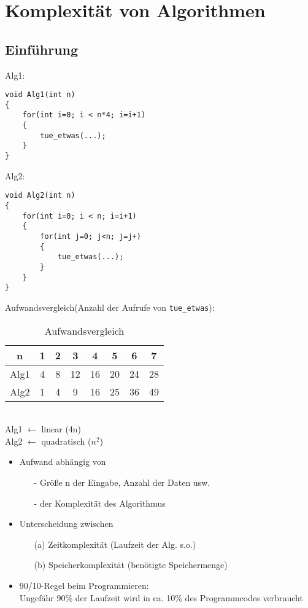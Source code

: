 \section{Komplexität von Algorithmen}
\subsection{Einführung}
Alg1:
\begin{lstlisting}
void Alg1(int n)
{
	for(int i=0; i < n*4; i=i+1)
	{
		tue_etwas(...);
	}
}
\end{lstlisting}
Alg2:
\begin{lstlisting}
void Alg2(int n)
{
	for(int i=0; i < n; i=i+1)
	{
		for(int j=0; j<n; j=j+)
		{
			tue_etwas(...);
		}
	}
}
\end{lstlisting}
Aufwandsvergleich(Anzahl der Aufrufe von \texttt{tue\_etwas}): \\
\begin{table}[h]
	\caption[Aufwandsvergleich der Algorithmen]{Aufwandsvergleich}
	\begin{center}
	\begin{tabular}{c|ccccccc}
		n & 1 & 2 & 3 & 4 & 5 & 6 & 7\\
		\hline
		Alg1 & 4 & 8 & 12 & 16 & 20 & 24 & 28\\
		Alg2 & 1 & 4 & 9 & 16 & 25 & 36 & 49\\
	\end{tabular}
	\end{center}
\end{table}
~\\
Alg1 $\longleftarrow$ linear (4n) \\
Alg2 $\longleftarrow$ quadratisch ($n^2$) \\
\begin{itemize}
\item Aufwand abhängig von
	\begin{itemize}
	\item[-] Größe n der Eingabe, Anzahl der Daten usw.
	\item[-] der Komplexität des Algorithmus
	\end{itemize}
\item Unterscheidung zwischen 
	\begin{itemize}
	\item[(a)] Zeitkomplexität (Laufzeit der Alg. s.o.)
	\item[(b)] Speicherkomplexität (benötigte Speichermenge)
	\end{itemize}
\item 90/10-Regel beim Programmieren: \\ 
\glqq Ungefähr 90\% der Laufzeit wird in ca. 10\% des Programmcodes verbraucht\grqq
\end{itemize}
